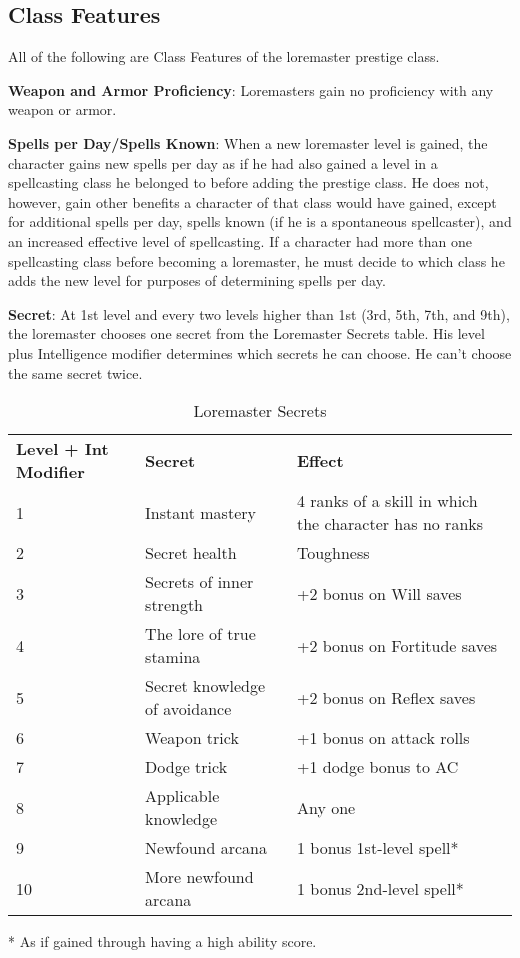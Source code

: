 \subsection{Class Features}

				
All of the following are Class Features of the loremaster prestige class.
				
\textbf{Weapon and Armor Proficiency}: Loremasters gain no proficiency with any weapon or armor.
				
\textbf{Spells per Day/Spells Known}: When a new loremaster level is gained, the character gains new spells per day as if he had also gained a level in a spellcasting class he belonged to before adding the prestige class. He does not, however, gain other benefits a character of that class would have gained, except for additional spells per day, spells known (if he is a spontaneous spellcaster), and an increased effective level of spellcasting. If a character had more than one spellcasting class before becoming a loremaster, he must decide to which class he adds the new level for purposes of determining spells per day.
				
\textbf{Secret}: At 1st level and every two levels higher than 1st (3rd, 5th, 7th, and 9th), the loremaster chooses one secret from the Loremaster Secrets table. His level plus Intelligence modifier determines which secrets he can choose. He can't choose the same secret twice.
		
\begin{table}[]
\sffamily
\caption{Loremaster Secrets}
\begin{tabular}{lll}
\textbf{Level + Int Modifier} & \textbf{Secret} & \textbf{Effect}\\
1 & Instant mastery & 4 ranks of a skill in which the character has no ranks\\
2 & Secret health & Toughness\\
3 & Secrets of inner strength & +2 bonus on Will saves\\
4 & The lore of true stamina & +2 bonus on Fortitude saves\\
5 & Secret knowledge of avoidance & +2 bonus on Reflex saves\\
6 & Weapon trick & +1 bonus on attack rolls\\
7 & Dodge trick & +1 dodge bonus to AC\\
8 & Applicable knowledge & Any one \\
9 & Newfound arcana & 1 bonus 1st-level spell*\\
10 & More newfound arcana & 1 bonus 2nd-level spell*\\
\end{tabular}
* As if gained through having a high ability score.\\
\end{table}

